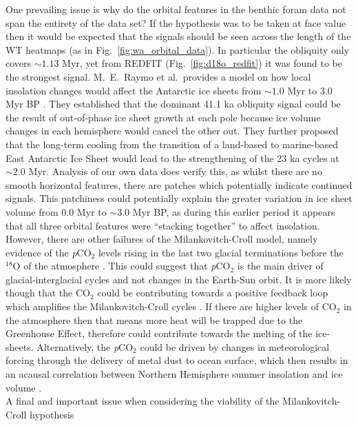 \documentclass[12pt, onecolumn]{revtex4}    %
\begin{document}
One prevailing issue is why do the orbital features in the benthic foram data not span the entirety of the data set? If the hypothesis was to be taken at face value then it would be expected that the signals should be seen across the length of the WT heatmaps (as in Fig.~\ref{fig:wa_orbital_data}). In particular the obliquity only covers $\sim 1.13$ Myr, yet from REDFIT (Fig.~\ref{fig:d18o_redfit}) it was found to be the strongest signal. M.~E.~Raymo et al.~provides a model on how local insolation changes would affect the Antarctic ice sheets from $\sim 1.0$ Myr to 3.0 Myr BP \cite{raymo_plio}. They established that the dominant 41.1 ka obliquity signal could be the result of out-of-phase ice sheet growth at each pole because ice volume changes in each hemisphere would cancel the other out. They further proposed that the long-term cooling from the transition of a land-based to marine-based East Antarctic Ice Sheet would lead to the strengthening of the 23 ka cycles at $\sim 2.0$ Myr. Analysis of our own data does verify this, as whilst there are no smooth horizontal features, there are patches which potentially indicate continued signals. This patchiness could potentially explain the greater variation in ice sheet volume from 0.0 Myr to $\sim 3.0$ Myr BP, as during this earlier period it appears that all three orbital features were ``stacking together'' to affect insolation. \\ 

However, there are other failures of the Milankovitch-Croll model, namely evidence of the \textit{p}CO$_{2}$ levels rising in the last two glacial terminations before the $^{18}$O of the atmosphere \cite{sowers_climate, broecker_terminationii}. This could suggest that \textit{p}CO$_{2}$ is the main driver of glacial-interglacial cycles and not changes in the Earth-Sun orbit. It is more likely though that the CO$_{2}$ could be contributing towards a positive feedback loop which amplifies the Milankovitch-Croll cycles \cite{sigman_atmosphere}. If there are higher levels of CO$_{2}$ in the atmosphere then that means more heat will be trapped due to the Greenhouse Effect, therefore could contribute towards the melting of the ice-sheets. Alternatively, the \textit{p}CO$_{2}$ could be driven by changes in meteorological forcing through the delivery of metal dust to ocean surface, which then results in an acausal correlation between Northern Hemisphere summer insolation and ice volume \cite{archer_pco2}. \\

A final and important issue when considering the viability of the Milankovitch-Croll hypothesis 
\end{document}
